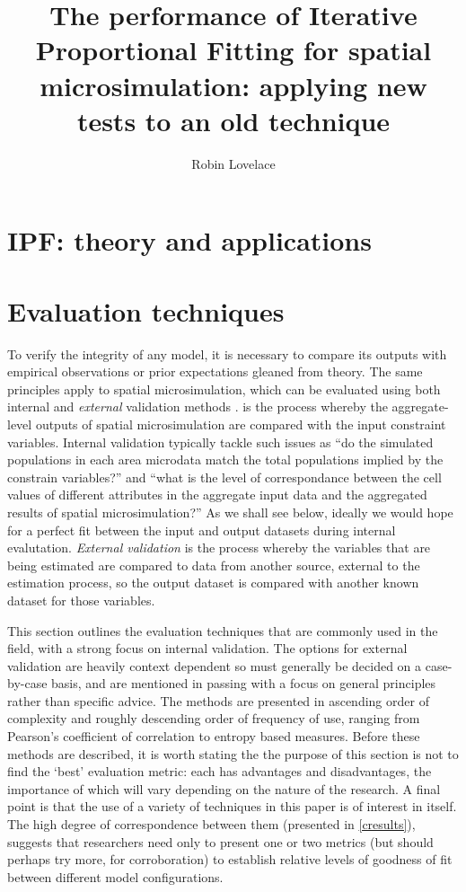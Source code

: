 \documentclass[a4paper,10pt]{article}
\title{The performance of Iterative Proportional Fitting for spatial microsimulation: applying new tests to an old technique}
\author{Robin Lovelace}
\begin{document}
\maketitle

\section{IPF: theory and applications}
\section{Evaluation techniques}

To verify the integrity of any model, it is necessary to compare its outputs 
with empirical observations or prior expectations gleaned from theory. 
The same principles apply to spatial microsimulation, which can be evaluated using
both internal and \emph{external} validation methods \citep{Edwards2009}. 
 is the process whereby
the aggregate-level outputs of spatial microsimulation are compared with
the input constraint variables. Internal validation typically tackle such issues 
as ``do the simulated populations in each area 
microdata match the total populations implied by the constrain variables?''
and ``what is the level of correspondance between the cell values of different 
attributes in the aggregate input data and the aggregated results of spatial microsimulation?''
As we shall see below, ideally we would hope for a perfect fit between the input
and output datasets during internal evalutation. 
\emph{External validation} is the process whereby the variables that are 
being estimated are compared to data from another source, 
external to the estimation process, so the output dataset is compared with 
another known dataset for those variables.

This section outlines the evaluation techniques that are commonly used in the 
field, with a strong focus on internal validation. The options for external
validation are heavily context dependent so must generally be decided on a 
case-by-case basis, and are mentioned in passing with a focus on general principles
rather than specific advice. The methods are presented in ascending order of complexity
and roughly descending order of frequency of use, ranging from Pearson's coefficient of 
correlation to entropy based measures. Before these methods are described, it is 
worth stating the the purpose of this section is not to find the `best' evaluation metric:
each has advantages and disadvantages, the importance of which will vary depending on the 
nature of the research. A final point is that the use of a variety of techniques in this paper
is of interest in itself. The high degree of correspondence between them (presented in \cref{cresults}), 
suggests that researchers need only to present one or two metrics (but should
perhaps try more, for corroboration) to establish relative levels of goodness of fit between 
different model configurations.
\end{document}
